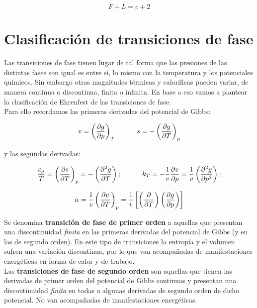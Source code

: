\documentclass[12pt]{book}
\begin{document}
\begin{equation}
F + L = c +2
\end{equation}


\section{Clasificación de transiciones de fase}

Las transiciones de fase tienen lugar de tal forma que las presiones de las distintas fases son igual es entre sí, lo mismo con la temperatura y los potenciales químicos. Sin embargo otras magnitudes térmicas y caloríficas pueden variar, de manera continua o discontinua, finita o infinita. En base a eso vamos a plantear la clasificación de Ehrenfest de las transiciones de fase.  \\

Para ello recordamos las primeras derivadas del potencial de Gibbs:

\begin{equation}
v = \left( \frac{\partial g}{\partial p} \right)_T \quad \quad \quad s = - \left( \frac{\partial g}{\partial T} \right)_p
\end{equation}


y las segundas derivadas:

\begin{equation}
\dfrac{c_p}{T} = \left( \frac{\partial s}{\partial T} \right)_p = - \left( \frac{\partial ^2 g}{\partial T} \right);  \quad \quad \quad k_T = - \dfrac{1}{v} \frac{\partial v}{\partial p} = \dfrac{1}{v} \left( \frac{\partial ^2 g}{\partial p^2} \right);
\end{equation}

\begin{equation}
\alpha = \dfrac{1}{v} \left( \frac{\partial v}{\partial T} \right)_p = \dfrac{1}{v} \left[ \left( \frac{\partial }{\partial T} \right) \left( \frac{\partial g}{\partial p} \right) \right]
\end{equation}

Se denomina \textbf{transición de fase de primer orden} a aquellas que presentan una discontinuidad \textit{finita}  en las primeras derivadas del potencial de Gibbs (y en las de segundo orden). En este tipo de transiciones la entropía y el volumen sufren una variación discontinua, por lo que van acompañadas de manifestaciones energéticas en forma de calor y de trabajo. \\

Las \textbf{transiciones de fase de segundo orden} son aquellas que tienen las derivadas de primer orden del potencial de Gibbs continuas y presentan una discontinuidad \textit{finita} en todas o algunas derivadas de segundo orden de dicho potencial. No van acompañadas de manifestaciones energéticas.\\
\end{document}
